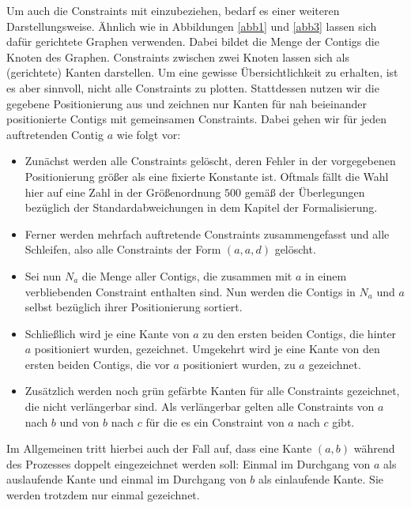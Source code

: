 Um auch die Constraints mit einzubeziehen, bedarf es einer weiteren Darstellungsweise.
Ähnlich wie in Abbildungen \ref{abb1} und \ref{abb3} lassen sich dafür gerichtete Graphen verwenden. Dabei bildet die Menge der Contigs die Knoten des Graphen. Constraints zwischen zwei Knoten lassen sich als (gerichtete) Kanten darstellen.
Um eine gewisse Übersichtlichkeit zu erhalten, ist es aber sinnvoll, nicht alle Constraints zu plotten.
Stattdessen nutzen wir die gegebene Positionierung aus und zeichnen nur Kanten für nah beieinander positionierte Contigs mit gemeinsamen Constraints. %
Dabei gehen wir für jeden auftretenden Contig $a$ wie folgt vor:
\begin{itemize}
\item Zunächst werden alle Constraints gelöscht, deren Fehler in der vorgegebenen Positionierung größer als eine fixierte Konstante ist. Oftmals fällt die Wahl hier auf eine Zahl in der Größenordnung $500$ gemäß der Überlegungen bezüglich der Standardabweichungen in dem Kapitel der Formalisierung.
\item Ferner werden mehrfach auftretende Constraints zusammengefasst und alle Schleifen, also alle Constraints der Form $(a, a, d)$ gelöscht.
\item Sei nun $N_a$ die Menge aller Contigs, die zusammen mit $a$ in einem verbliebenden Constraint enthalten sind. Nun werden die Contigs in $N_a$ und $a$ selbst bezüglich ihrer Positionierung sortiert.
\item Schließlich wird je eine Kante von $a$ zu den ersten beiden Contigs, die hinter $a$ positioniert wurden, gezeichnet. Umgekehrt wird je eine Kante von den ersten beiden Contigs, die vor $a$ positioniert wurden, zu $a$ gezeichnet.
\item Zusätzlich werden noch grün gefärbte Kanten 
für alle Constraints gezeichnet, die nicht verlängerbar sind. Als verlängerbar gelten alle Constraints von $a$ nach $b$ und von $b$ nach $c$ für die es ein Constraint von $a$ nach $c$ gibt.
\end{itemize}
Im Allgemeinen tritt hierbei auch der Fall auf, dass eine Kante $(a,b)$ während des Prozesses doppelt eingezeichnet werden soll: Einmal im Durchgang von $a$ als auslaufende Kante und einmal im Durchgang von $b$ als einlaufende Kante.
Sie werden trotzdem nur einmal gezeichnet.

